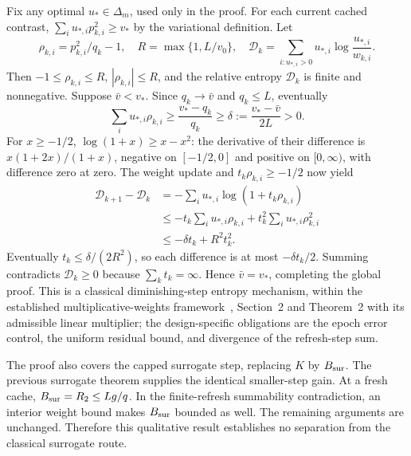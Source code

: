 \documentclass[11pt]{article}
\begin{document}
Fix any optimal $u_*\in\Delta_m$, used only in the proof. For each current cached contrast,
$\sum_i u_{*,i}p_{k,i}^2\ge v_*$ by the variational definition. Let
\[
 \rho_{k,i}=p_{k,i}^2/q_k-1,\quad
 R=\max\{1,L/v_0\},\quad
 \mathcal D_k=\sum_{i:u_{*,i}>0}u_{*,i}\log\frac{u_{*,i}}{w_{k,i}}.
\]
Then $-1\le\rho_{k,i}\le R$, $|\rho_{k,i}|\le R$, and the relative entropy $\mathcal D_k$ is finite and nonnegative. Suppose $\bar v<v_*$. Since $q_k\to\bar v$ and $q_k\le L$, eventually
\[
 \sum_i u_{*,i}\rho_{k,i}\ge\frac{v_*-q_k}{q_k}
 \ge\delta:=\frac{v_*-\bar v}{2L}>0.
\]
For $x\ge-1/2$, $\log(1+x)\ge x-x^2$: the derivative of their difference is $x(1+2x)/(1+x)$, negative on $[-1/2,0]$ and positive on $[0,\infty)$, with difference zero at zero. The weight update and $t_k\rho_{k,i}\ge-1/2$ now yield
\begin{align*}
 \mathcal D_{k+1}-\mathcal D_k
 &=-\sum_i u_{*,i}\log(1+t_k\rho_{k,i})\\
 &\le-t_k\sum_i u_{*,i}\rho_{k,i}
       +t_k^2\sum_i u_{*,i}\rho_{k,i}^2\\
 &\le-\delta t_k+R^2t_k^2.
\end{align*}
Eventually $t_k\le\delta/(2R^2)$, so each difference is at most $-\delta t_k/2$. Summing contradicts $\mathcal D_k\ge0$ because $\sum_k t_k=\infty$. Hence $\bar v=v_*$, completing the global proof. This is a classical diminishing-step entropy mechanism, within the established multiplicative-weights framework~\cite{freund1997}, Section~2 and Theorem~2 with its admissible linear multiplier; the design-specific obligations are the epoch error control, the uniform residual bound, and divergence of the refresh-step sum.

The proof also covers the capped surrogate step, replacing $K$ by $B_{\rm sur}$. The previous surrogate theorem supplies the identical smaller-step gain. At a fresh cache, $B_{\rm sur}=R_2\le Lg/q$. In the finite-refresh summability contradiction, an interior weight bound makes $B_{\rm sur}$ bounded as well. The remaining arguments are unchanged. Therefore this qualitative result establishes no separation from the classical surrogate route.
\end{document}
